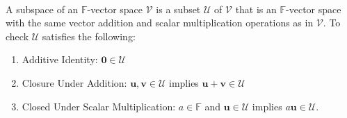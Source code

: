 \begin{definition} \\
A subspace of an $\mathbb{F}$-vector space $\mathcal{V}$ is a subset $\mathcal{U}$ of $\mathcal{V}$ that is an $\mathbb{F}$-vector space with the same vector addition and scalar multiplication operations as in $\mathcal{V}$. To check $\mathcal{U}$ satisfies the following:
\begin{enumerate}[label=\roman*.]
\setlength{\itemsep}{0pt}
\item Additive Identity: $\mathbf{0} \in \mathcal{U}$
\item Closure Under Addition: $\mathbf{u}, \mathbf{v} \in \mathcal{U}$ implies $\mathbf{u} + \mathbf{v} \in \mathcal{U}$
\item Closed Under Scalar Multiplication: $a \in \mathbb{F}$ and $\mathbf{u} \in \mathcal{U}$ implies $a \mathbf{u} \in \mathcal{U}$.
\end{enumerate}
\end{definition}